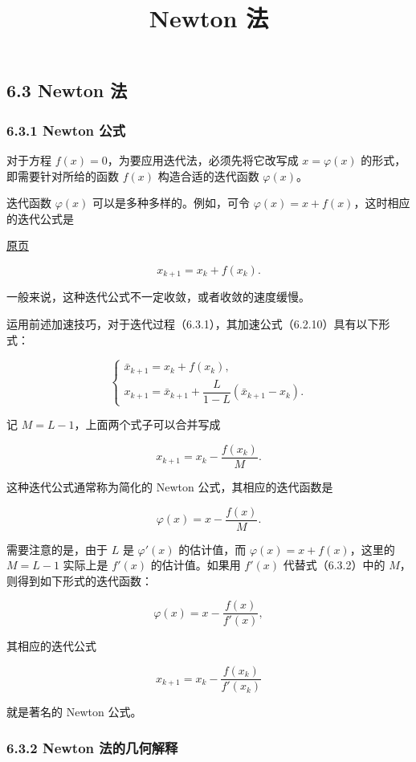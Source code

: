 \documentclass[
  10pt,
  fontset=fandol]{ctexart}
\title{Newton 法}
\author{}
\date{}
\begin{document}
\maketitle

\subsection{6.3 Newton 法}\label{newton-ux6cd5}

\subsubsection{6.3.1 Newton 公式}\label{newton-ux516cux5f0f}

对于方程 \(f(x)=0\)，为要应用迭代法，必须先将它改写成 \(x=\varphi(x)\) 的形式，即需要针对所给的函数 \(f(x)\) 构造合适的迭代函数 \(\varphi(x)\)。

迭代函数 \(\varphi(x)\) 可以是多种多样的。例如，可令 \(\varphi(x)=x+f(x)\)，这时相应的迭代公式是

\href{../../source-images/pdf-163.jpeg}{原页}

\[
x_{k+1}=x_k+f(x_k).
\tag{6.3.1}
\]

一般来说，这种迭代公式不一定收敛，或者收敛的速度缓慢。

运用前述加速技巧，对于迭代过程（6.3.1），其加速公式（6.2.10）具有以下形式：

\[
\begin{cases}
\bar{x}_{k+1}=x_k+f(x_k),\\
x_{k+1}=\bar{x}_{k+1}+\dfrac{L}{1-L}(\bar{x}_{k+1}-x_k).
\end{cases}
\]

记 \(M=L-1\)，上面两个式子可以合并写成

\[
x_{k+1}=x_k-\frac{f(x_k)}{M}.
\]

这种迭代公式通常称为简化的 Newton 公式，其相应的迭代函数是

\[
\varphi(x)=x-\frac{f(x)}{M}.
\tag{6.3.2}
\]

需要注意的是，由于 \(L\) 是 \(\varphi'(x)\) 的估计值，而 \(\varphi(x)=x+f(x)\)，这里的 \(M=L-1\) 实际上是 \(f'(x)\) 的估计值。如果用 \(f'(x)\) 代替式（6.3.2）中的 \(M\)，则得到如下形式的迭代函数：

\[
\varphi(x)=x-\frac{f(x)}{f'(x)},
\]

其相应的迭代公式

\[
x_{k+1}=x_k-\frac{f(x_k)}{f'(x_k)}
\tag{6.3.3}
\]

就是著名的 Newton 公式。

\subsubsection{6.3.2 Newton 法的几何解释}\label{newton-ux6cd5ux7684ux51e0ux4f55ux89e3ux91ca}
\end{document}

